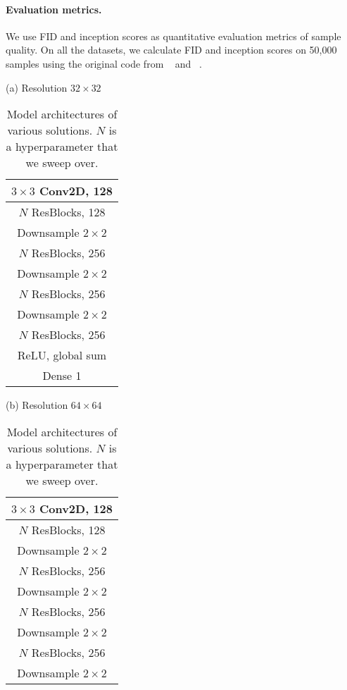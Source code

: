\documentclass{article} \usepackage{iclr2021_conference,times}
\begin{document}
\paragraph{Evaluation metrics.} We use FID and inception scores as quantitative evaluation metrics of sample quality. On all the datasets, we calculate FID and inception scores on 50,000 samples using the original code from ~\citet{salimans2016improved} and ~\citet{heusel2017gans}. 

\begin{table}[ht]
\centering
 \caption{Model architectures of various solutions. $N$ is a hyperparameter that we sweep over.} 
 \footnotesize
 \begin{minipage}[t]{.3\textwidth}
 \centering
 (a) Resolution $32 \times 32$\\
 \begin{tabular}{c}
    \toprule
    $3 \times 3$ Conv2D, 128 \\
    \midrule
    $N$ ResBlocks, 128\\
    Downsample $2 \times 2$\\
    \midrule
    $N$ ResBlocks, 256 \\
    Downsample $2 \times 2$\\
    \midrule 
     $N$ ResBlocks, 256 \\
    Downsample $2 \times 2$\\
     \midrule 
     $N$ ResBlocks, 256 \\
    \midrule 
    ReLU, global sum\\
    Dense 1 \\
    \bottomrule 
\end{tabular}
 \end{minipage}
  \begin{minipage}[t]{.3\textwidth}
  \centering
 (b) Resolution $64 \times 64$ \\
 \begin{tabular}{c}
    \toprule
    $3 \times 3$ Conv2D, 128 \\
    \midrule
    $N$ ResBlocks, 128\\
    Downsample $2 \times 2$\\
    \midrule
    $N$ ResBlocks, 256 \\
    Downsample $2 \times 2$\\
    \midrule 
   $N$ ResBlocks, 256 \\
    Downsample $2 \times 2$\\
     \midrule 
   $N$ ResBlocks, 256 \\
    Downsample $2 \times 2$\\

\end{tabular}
\end{minipage}
\end{table}
\end{document}

